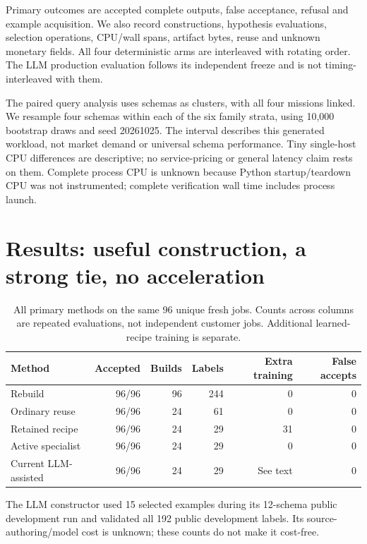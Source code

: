 \documentclass[11pt,letterpaper]{article}
\begin{document}
Primary outcomes are accepted complete outputs, false acceptance, refusal and example acquisition. We also record constructions, hypothesis evaluations, selection operations, CPU/wall spans, artifact bytes, reuse and unknown monetary fields. All four deterministic arms are interleaved with rotating order. The LLM production evaluation follows its independent freeze and is not timing-interleaved with them.

The paired query analysis uses schemas as clusters, with all four missions linked. We resample four schemas within each of the six family strata, using 10,000 bootstrap draws and seed 20261025. The interval describes this generated workload, not market demand or universal schema performance. Tiny single-host CPU differences are descriptive; no service-pricing or general latency claim rests on them. Complete process CPU is unknown because Python startup/teardown CPU was not instrumented; complete verification wall time includes process launch.

\section{Results: useful construction, a strong tie, no acceleration}
\label{sec:results}

\begin{table}[htbp]
\small
\caption{All primary methods on the same 96 unique fresh jobs. Counts across columns are repeated evaluations, not independent customer jobs. Additional learned-recipe training is separate.}
\label{tab:results}
\begin{tabularx}{\textwidth}{@{}Yrrrrr@{}}
\toprule Method & Accepted & Builds & Labels & Extra training & False accepts\\\midrule
Rebuild & 96/96 & 96 & 244 & 0 & 0\\
Ordinary reuse & 96/96 & 24 & 61 & 0 & 0\\
Retained recipe & 96/96 & 24 & 29 & 31 & 0\\
Active specialist & 96/96 & 24 & 29 & 0 & 0\\
Current LLM-assisted & 96/96 & 24 & 29 & See text & 0\\
\bottomrule
\end{tabularx}
\vspace{4pt}
{\footnotesize The LLM constructor used 15 selected examples during its 12-schema public development run and validated all 192 public development labels. Its source-authoring/model cost is unknown; these counts do not make it cost-free.}
\end{table}
\end{document}
